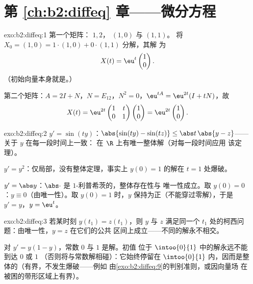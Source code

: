 \section*{第 \ref{ch:b2:diffeq} 章——微分方程}

\begin{solution}{exo:b2:diffeq:1}
第一个矩阵： $1, 2$， $(1,0)$ 与 $(1,1)$。
将 $X_0 = (1,0) = 1\cdot(1,0) + 0\cdot(1,1)$ 分解，其解
为
\[
X(t) = \eu^{t}\begin{pmatrix}1\\ 0\end{pmatrix} .
\]
（初始向量本身就是。）

第二个矩阵：$A = 2I + N$，$N = E_{12}$，$N^2 = 0$，$\eu^{tA} =
\eu^{2t}(I + tN)$，故
\[
X(t) = \eu^{2t}\begin{pmatrix} 1 & t\\ 0 & 1\end{pmatrix}
\begin{pmatrix}1\\ 0\end{pmatrix}
= \eu^{2t}\begin{pmatrix}1\\ 0\end{pmatrix}.
\]
\end{solution}

\begin{solution}{exo:b2:diffeq:2}
$y' = \sin(ty)$：$\abs{\sin(ty) - \sin(tz)} \leq \abs t\,\abs{y -
z}$——关于 $y$ 在每一段时间上一致：
在 $\R$ 上有唯一整体解（对每一段时间应用
该定理）。

$y' = y^2$：仅局部，没有整体定理，事实上
$y(0) = 1$ 的解在 $t = 1$ 处爆破。

$y' = \abs y$：$\abs\cdot$ 是 $1$-利普希茨的，整体存在性与
唯一性成立。取 $y(0) = 0$：$y \equiv 0$（由唯一性）。取 $y(0)
= 1$ 时，$y$ 保持为正（不能穿过零解），于是 $y' =
y$，$y = \eu^t$。
\end{solution}

\begin{solution}{exo:b2:diffeq:3}
若某时刻 $y(t_1) = z(t_1)$，则 $y$ 与 $z$ 满足同一个
$t_1$ 处的柯西问题：由唯一性，$y = z$ 在它们的公共
区间上成立——不同的解永不相交。

对 $y' = y(1-y)$，常数 $0$ 与 $1$ 是解。初值
位于 $\intoo{0}{1}$ 中的解永远不能到达 $0$ 或 $1$
（否则将与常数解相碰）：它始终停留在
$\intoo{0}{1}$ 内，因而是整体的（有界，不发生爆破——例如
由\cref{exo:b2:diffeq:9}的判别准则，或因向量场
在被困的带形区域上有界）。
\end{solution}

